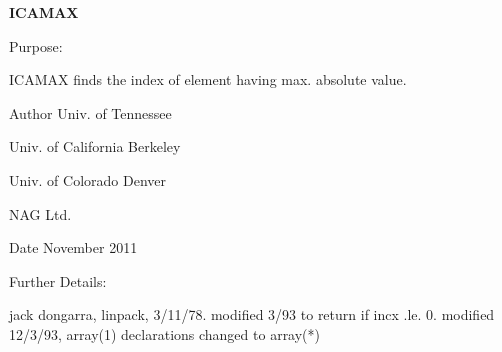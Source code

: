 {\bfseries I\+C\+A\+M\+A\+X} 

\begin{DoxyParagraph}{Purpose\+: }
\begin{DoxyVerb}    ICAMAX finds the index of element having max. absolute value.\end{DoxyVerb}
 
\end{DoxyParagraph}
\begin{DoxyAuthor}{Author}
Univ. of Tennessee 

Univ. of California Berkeley 

Univ. of Colorado Denver 

N\+A\+G Ltd. 
\end{DoxyAuthor}
\begin{DoxyDate}{Date}
November 2011 
\end{DoxyDate}
\begin{DoxyParagraph}{Further Details\+: }
\begin{DoxyVerb}     jack dongarra, linpack, 3/11/78.
     modified 3/93 to return if incx .le. 0.
     modified 12/3/93, array(1) declarations changed to array(*)\end{DoxyVerb}
 
\end{DoxyParagraph}
